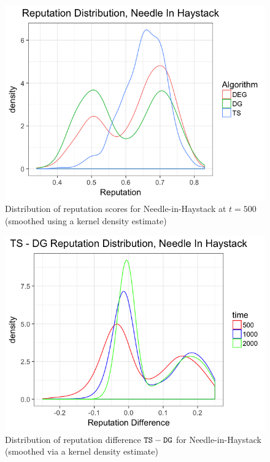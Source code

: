 \documentclass[../competing_bandits.tex]{subfiles}
\begin{document}
\begin{figure}[ht]
\includegraphics[scale=0.35]{figures/rep_distribution_nih}
\caption{Distribution of reputation scores for Needle-in-Haystack at $t=500$ (smoothed using a kernel density estimate)}
\label{rep_dist_nih}
\end{figure}

\begin{figure}[ht]
\includegraphics[scale=0.35]{figures/ts_dg_rep_diff_nih}
\caption{Distribution of reputation difference $\mathtt{TS}-\mathtt{DG}$ for  Needle-in-Haystack
(smoothed via a kernel density estimate)}
\label{ts_dg_rep_diff_nih}
\end{figure}
\end{document}
